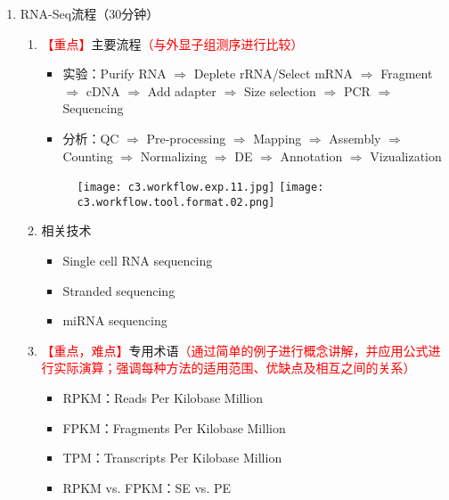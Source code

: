 \documentclass{TIJMUjiaoanLL}
\begin{document}
\begin{enumerate}
  \item RNA-Seq流程（30分钟）
    \begin{enumerate}
      \item \textcolor{red}{【重点】}主要流程\textcolor{red}{（与外显子组测序进行比较）}
        \begin{itemize}
          \item 实验：Purify RNA $\Rightarrow$ Deplete rRNA/Select mRNA $\Rightarrow$ Fragment $\Rightarrow$ cDNA $\Rightarrow$ Add adapter $\Rightarrow$ Size selection $\Rightarrow$ PCR $\Rightarrow$ Sequencing
          \item 分析：QC $\Rightarrow$ Pre-processing $\Rightarrow$ Mapping $\Rightarrow$ Assembly $\Rightarrow$ Counting $\Rightarrow$ Normalizing $\Rightarrow$ DE $\Rightarrow$ Annotation $\Rightarrow$ Vizualization
        \end{itemize}
        \vspace{-1em}
        \begin{figure}[h]
          \centering
          \texttt{[image: c3.workflow.exp.11.jpg]}
          \texttt{[image: c3.workflow.tool.format.02.png]}
        \end{figure}
        \vspace{-1em}
      \item 相关技术
        \begin{itemize}
          \item Single cell RNA sequencing
          \item Stranded sequencing
          \item miRNA sequencing
        \end{itemize}
      \item \textcolor{red}{【重点，难点】}专用术语\textcolor{red}{（通过简单的例子进行概念讲解，并应用公式进行实际演算；强调每种方法的适用范围、优缺点及相互之间的关系）}
        \begin{itemize}
          \item RPKM：Reads Per Kilobase Million
          \item FPKM：Fragments Per Kilobase Million
          \item TPM：Transcripts Per Kilobase Million
          \item RPKM vs. FPKM：SE vs. PE
        \end{itemize}
    \end{enumerate}


\end{enumerate}
\end{document}

